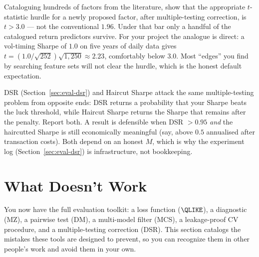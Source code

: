 \begin{keyresult}
Cataloguing hundreds of factors from the literature, \citet{HarveyLiuZhu2016} show that the appropriate $t$-statistic hurdle for a newly proposed factor, after multiple-testing correction, is $t > 3.0$ --- not the conventional $1.96$.
Under that bar only a handful of the catalogued return predictors survive.
For your project the analogue is direct: a vol-timing Sharpe of $1.0$ on five years of daily data gives $t = (1.0/\sqrt{252})\sqrt{1{,}250} \approx 2.23$, comfortably below $3.0$.
Most ``edges'' you find by searching feature sets will not clear the hurdle, which is the honest default expectation.
\end{keyresult}

\begin{keyidea}
DSR (Section~\ref{sec:eval-dsr}) and Haircut Sharpe attack the same multiple-testing problem from opposite ends: DSR returns a probability that your Sharpe beats the luck threshold, while Haircut Sharpe returns the Sharpe that remains after the penalty.
Report both.
A result is defensible when DSR $> 0.95$ \emph{and} the haircutted Sharpe is still economically meaningful (say, above $0.5$ annualised after transaction costs).
Both depend on an honest $M$, which is why the experiment log (Section~\ref{sec:eval-dsr}) is infrastructure, not bookkeeping.
\end{keyidea}


\section{What Doesn't Work}
\label{sec:eval-pitfalls}

You now have the full evaluation toolkit: a loss function ($\QLIKE$), a diagnostic (MZ), a pairwise test (DM), a multi-model filter (MCS), a leakage-proof CV procedure, and a multiple-testing correction (DSR).
This section catalogs the mistakes these tools are designed to prevent, so you can recognize them in other people's work and avoid them in your own.

